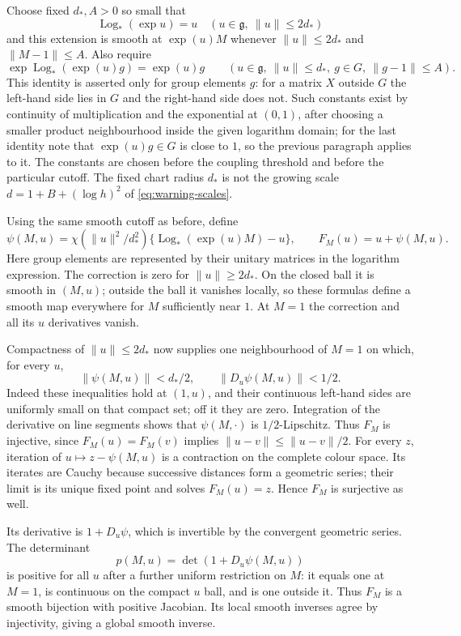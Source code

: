 Choose fixed $d_*,A>0$ so small that
\[
 \operatorname{Log}_*(\exp u)=u\quad(u\in\mathfrak g,\ \|u\|\le2d_*)
\]
and this extension is smooth at $\exp(u)M$ whenever
$\|u\|\le2d_*$ and $\|M-1\|\le A$. Also require
\[
 \exp\operatorname{Log}_*(\exp(u)g)=\exp(u)g
 \qquad(u\in\mathfrak g,\ \|u\|\le d_*,\ g\in G,\ \|g-1\|\le A).
\]
This identity is asserted only for group elements $g$: for a matrix
$X$ outside $G$ the left-hand side lies in $G$ and the right-hand side
does not. Such constants exist by continuity of multiplication
and the exponential at $(0,1)$, after choosing a smaller product
neighbourhood inside the given logarithm domain; for the last identity
note that $\exp(u)g\in G$ is close to $1$, so the previous paragraph
applies to it. The constants are chosen before the coupling threshold
and before the particular cutoff. The fixed chart radius $d_*$ is not
the growing scale $d=1+B+(\log h)^2$ of \eqref{eq:warning-scales}.

Using the same smooth cutoff as before, define
\[
 \psi(M,u)=\chi(\|u\|^2/d_*^2)\{\operatorname{Log}_*(\exp(u)M)-u\},
 \qquad F_M(u)=u+\psi(M,u).
\]
Here group elements are represented by their unitary matrices in the
logarithm expression. The correction is zero for $\|u\|\ge2d_*$.
On the closed ball it is smooth in $(M,u)$; outside the ball it
vanishes locally, so these formulas define a smooth map everywhere
for $M$ sufficiently near $1$. At $M=1$ the correction and all its
$u$ derivatives vanish.

Compactness of $\|u\|\le2d_*$ now supplies one neighbourhood of
$M=1$ on which, for every $u$,
\begin{equation}\label{eq:compensator-small}
 \|\psi(M,u)\|<d_*/2,\qquad \|D_u\psi(M,u)\|<1/2.
\end{equation}
Indeed these inequalities hold at $(1,u)$, and their continuous
left-hand sides are uniformly small on that compact set; off it they
are zero. Integration of the derivative on line segments shows that
$\psi(M,\cdot)$ is $1/2$-Lipschitz. Thus $F_M$ is injective, since
$F_M(u)=F_M(v)$ implies $\|u-v\|\le\|u-v\|/2$.
For every $z$, iteration of $u\mapsto z-\psi(M,u)$ is a contraction
on the complete colour space. Its iterates are Cauchy because successive
distances form a geometric series; their limit is its unique fixed
point and solves $F_M(u)=z$. Hence $F_M$ is surjective as well.

Its derivative is $1+D_u\psi$, which is invertible by the convergent
geometric series. The determinant
\[
 p(M,u)=\det(1+D_u\psi(M,u))
\]
is positive for all $u$ after a further uniform restriction on $M$:
it equals one at $M=1$, is continuous on the compact $u$ ball, and
is one outside it. Thus $F_M$ is a smooth bijection with positive
Jacobian. Its local smooth inverses agree by injectivity, giving a
global smooth inverse.

